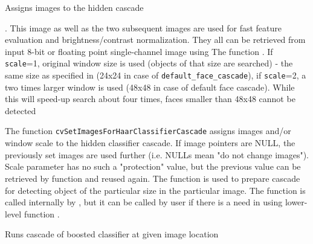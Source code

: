 Assigns images to the hidden cascade


\begin{description}
. This image as well as the two subsequent images are used for fast feature evaluation and brightness/contrast normalization. They all can be retrieved from input 8-bit or floating point single-channel image using The function 
. If \texttt{scale}=1, original window size is used (objects of that size are searched) - the same size as specified in  (24x24 in case of \texttt{default\_face\_cascade}), if \texttt{scale}=2, a two times larger window is used (48x48 in case of default face cascade). While this will speed-up search about four times, faces smaller than 48x48 cannot be detected
\end{description}

The function \texttt{cvSetImagesForHaarClassifierCascade} assigns images and/or window scale to the hidden classifier cascade. If image pointers are NULL, the previously set images are used further (i.e. NULLs mean "do not change images"). Scale parameter has no such a "protection" value, but the previous value can be retrieved by  function and reused again. The function is used to prepare cascade for detecting object of the particular size in the particular image. The function is called internally by , but it can be called by user if there is a need in using lower-level function .

\label{RunHaarClassifierCascade}

Runs cascade of boosted classifier at given image location

